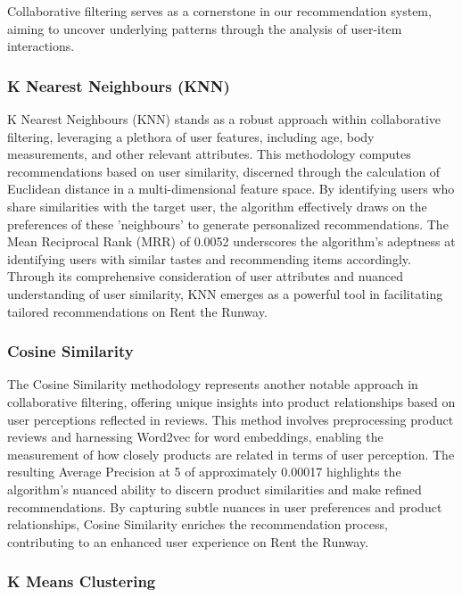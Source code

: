\documentclass[conference]{IEEEtran}
\begin{document}
Collaborative filtering serves as a cornerstone in our recommendation system, aiming to uncover underlying patterns through the analysis of user-item interactions.

\subsubsection{K Nearest Neighbours (KNN)}

K Nearest Neighbours (KNN) stands as a robust approach within collaborative filtering, leveraging a plethora of user features, including age, body measurements, and other relevant attributes. This methodology computes recommendations based on user similarity, discerned through the calculation of Euclidean distance in a multi-dimensional feature space. By identifying users who share similarities with the target user, the algorithm effectively draws on the preferences of these 'neighbours' to generate personalized recommendations. The Mean Reciprocal Rank (MRR) of 0.0052 underscores the algorithm's adeptness at identifying users with similar tastes and recommending items accordingly. Through its comprehensive consideration of user attributes and nuanced understanding of user similarity, KNN emerges as a powerful tool in facilitating tailored recommendations on Rent the Runway.

\subsubsection{Cosine Similarity}

The Cosine Similarity methodology represents another notable approach in collaborative filtering, offering unique insights into product relationships based on user perceptions reflected in reviews. This method involves preprocessing product reviews and harnessing Word2vec for word embeddings, enabling the measurement of how closely products are related in terms of user perception. The resulting Average Precision at 5 of approximately 0.00017 highlights the algorithm's nuanced ability to discern product similarities and make refined recommendations. By capturing subtle nuances in user preferences and product relationships, Cosine Similarity enriches the recommendation process, contributing to an enhanced user experience on Rent the Runway.

\subsubsection{K Means Clustering}
\end{document}
